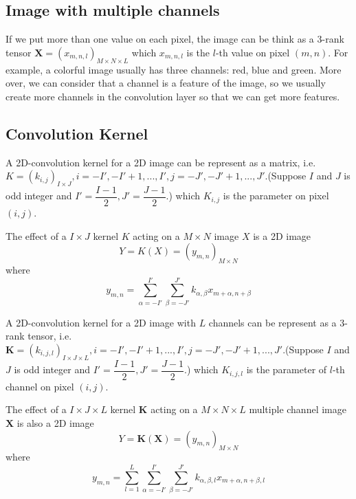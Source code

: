 	\subsection{Image with multiple channels}
	If we put more than one value on each pixel, the image can be think as a 3-rank tensor $\mathbf X = (x_{m,n,l})_{M\times N\times L}$ which $x_{m,n,l}$ is the $l$-th value on pixel $(m,n)$. For example, a colorful image usually has three channels: red, blue and green. More over, we can consider that a channel is a feature of the image, so we usually create more channels in the convolution layer so that we can get more features.
	\subsection{Convolution Kernel}
	A 2D-convolution kernel for a 2D image can be represent as a matrix, i.e. $K = (k_{i,j})_{I\times J}, i= -I',-I'+1,...,I', j = -J',-J'+1,...,J'$.(Suppose $I$ and $J$ is odd integer and $I' = \dfrac{I-1}2, J' = \dfrac{J-1}2 $.) which $K_{i,j}$ is the parameter on pixel $(i,j)$.
	
	The effect of a $I\times J$ kernel $K$ acting on a $M\times N$  image $X$ is a 2D image 
	$$
	Y =	 K ( X) = (y_{m,n})_{M\times N}
	$$
	where 
	\begin{equation}
	y_{m,n} =\sum_{\alpha = - I'}^{I'} \sum_{\beta = - J'}^{J'}k_{\alpha,\beta} x_{m+\alpha,n+\beta}
	\end{equation}
	
	A 2D-convolution kernel for a 2D image with $L$ channels can be represent as a 3-rank tensor, i.e. $\mathbf{K} = (k_{i,j,l})_{I\times J\times L}, i= -I',-I'+1,...,I', j = -J',-J'+1,...,J'$.(Suppose $I$ and $J$ is odd integer and $I' = \dfrac{I-1}2, J' = \dfrac{J-1}2 $.) which $K_{i,j,l}$ is the parameter of $l$-th channel on pixel $(i,j)$.
	
	 The effect of a $I\times J\times L$ kernel $\mathbf K $ acting on a $M\times N \times L$ multiple channel image $\mathbf X$ is also a 2D image 
	$$
		Y =	\mathbf K (\mathbf X) = (y_{m,n})_{M\times N}
	$$
	where 
	\begin{equation}
	y_{m,n} =\sum_{l=1}^L\sum_{\alpha = - I'}^{I'} \sum_{\beta = - J'}^{J'}k_{\alpha,\beta,l} x_{m+\alpha,n+\beta,l}
	\end{equation}
	
